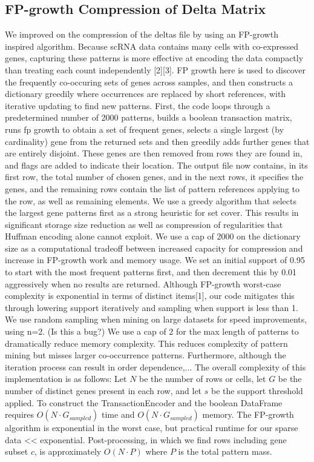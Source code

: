 \documentclass[unnumsec,webpdf,contemporary,large]{oup-authoring-template}
\begin{document}
\subsection{FP-growth Compression of Delta Matrix}
We improved on the compression of the deltas file by using an FP-growth inspired algorithm. Because scRNA data contains many cells with co-expressed genes, capturing these patterns is more effective at encoding the data compactly than treating each count independently [2][3]. FP growth here is used to discover the frequently co-occuring sets of genes across samples, and then constructs a dictionary greedily where occurrences are replaced by short references, with iterative updating to find new patterns. First, the code loops through a predetermined number of 2000 patterns, builds a boolean transaction matrix, runs fp growth to obtain a set of frequent genes, selects a single largest (by cardinality) gene from the returned sets and then greedily adds further genes that are entirely disjoint. These genes are then removed from rows they are found in, and flags are added to indicate their location. The output file now contains, in its first row, the total number of chosen genes, and in the next rows, it specifies the genes, and the remaining rows contain the list of pattern references applying to the row, as well as remaining elements. We use a greedy algorithm that selects the largest gene patterns first as a strong heuristic for set cover. This results in significant storage size reduction as well as compression of regularities that Huffman encoding alone cannot exploit. We use a cap of 2000 on the dictionary size as a computational tradeoff between increased capacity for compression and increase in FP-growth work and memory usage. We set an initial support of 0.95 to start with the most frequent patterns first, and then decrement this by 0.01 aggressively when no results are returned. Although FP-growth worst-case complexity is exponential in terms of distinct items[1], our code mitigates this through lowering support iteratively and sampling when support is less than 1. We use random sampling when mining on large datasets for speed improvements, using n=2. (Is this a bug?) We use a cap of 2 for the max length of patterns to dramatically reduce memory complexity. This reduces complexity of pattern mining but misses larger co-occurrence patterns. Furthermore, although the iteration process can result in order dependence,... The overall complexity of this implementation is as follows: Let $N$ be the number of rows or cells, let $G$ be the number of distinct genes present in each row, and let $s$ be the support threshold applied. To construct the TransactionEncoder and the boolean DataFrame requires $O(N\cdot G_{sampled})$ time and $O(N\cdot G_{sampled})$ memory. The FP-growth algorithm is exponential in the worst case, but practical runtime for our sparse data << exponential. Post-processing, in which we find rows including gene subset $c$, is approximately $O(N\cdot P)$ where $P$ is the total pattern mass.
\end{document}
